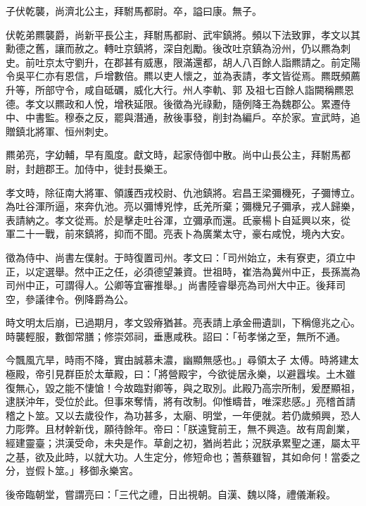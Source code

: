 \begin{pinyinscope}
 子伏乾襲，尚濟北公主，拜駙馬都尉。卒，謚曰康。無子。



 伏乾弟羆襲爵，尚新平長公主，拜駙馬都尉、武牢鎮將。頻以下法致罪，孝文以其勳德之舊，讓而赦之。轉吐京鎮將，深自剋勵。後改吐京鎮為汾州，仍以羆為刺史。前吐京太守劉升，在郡甚有威惠，限滿還都，胡人八百餘人詣羆請之。前定陽令吳平仁亦有恩信，戶增數倍。羆以吏人懷之，並為表請，孝文皆從焉。羆既頻薦升等，所部守令，咸自砥礪，威化大行。州人李軌、郭
 及祖七百餘人詣闕稱羆恩德。孝文以羆政和人悅，增秩延限。後徵為光祿勳，隨例降王為魏郡公。累遷侍中、中書監。穆泰之反，罷與潛通，赦後事發，削封為編戶。卒於家。宣武時，追贈鎮北將軍、恒州刺史。



 羆弟亮，字幼輔，早有風度。獻文時，起家侍御中散。尚中山長公主，拜駙馬都尉，封趙郡王。加侍中，徙封長樂王。



 孝文時，除征南大將軍、領護西戎校尉、仇池鎮將。宕昌王梁彌機死，子彌博立。為吐谷渾所逼，來奔仇池。亮以彌博兇悖，氐羌所棄；彌機兄子彌承，戎人歸樂，表請納之。孝文從焉。於是擊走吐谷渾，立彌承而還。氐豪楊卜自延興以來，從
 軍二十一戰，前來鎮將，抑而不聞。亮表卜為廣業太守，豪右咸悅，境內大安。



 徵為侍中、尚書左僕射。于時復置司州。孝文曰：「司州始立，未有寮吏，須立中正，以定選舉。然中正之任，必須德望兼資。世祖時，崔浩為冀州中正，長孫嵩為司州中正，可謂得人。公卿等宜審推舉。」尚書陸睿舉亮為司州大中正。後拜司空，參議律令。例降爵為公。



 時文明太后崩，已過期月，孝文毀瘠猶甚。亮表請上承金冊遺訓，下稱億兆之心。時襲輕服，數御常膳；修崇郊祠，垂惠咸秩。詔曰：「茍孝悌之至，無所不通。



 今飄風亢旱，時雨不降，實由誠慕未濃，幽顯無感也。」尋領太子
 太傅。時將建太極殿，帝引見群臣於太華殿，曰：「將營殿宇，今欲徙居永樂，以避囂埃。土木雖復無心，毀之能不悽愴！今故臨對卿等，與之取別。此殿乃高宗所制，爰歷顯祖，逮朕沖年，受位於此。但事來奪情，將有改制。仰惟疇昔，唯深悲感。」亮稽首請稽之卜筮。又以去歲役作，為功甚多，太廟、明堂，一年便就。若仍歲頻興，恐人力彫弊。且材幹新伐，願待餘年。帝曰：「朕遠覽前王，無不興造。故有周創業，經建靈臺；洪漢受命，未央是作。草創之初，猶尚若此；況朕承累聖之運，屬太平之基，欲及此時，以就大功。人生定分，修短命也；蓍蔡雖智，其如命何！當委之
 分，豈假卜筮。」移御永樂宮。



 後帝臨朝堂，嘗謂亮曰：「三代之禮，日出視朝。自漢、魏以降，禮儀漸殺。




\end{pinyinscope}
